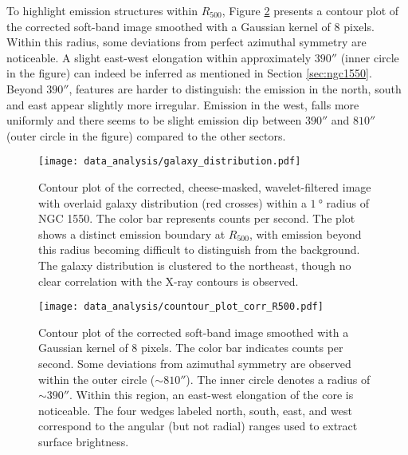 To highlight emission structures within \(R_{500}\), Figure \ref{fig:contour_fully_corrected} presents a contour plot of the corrected soft-band image smoothed with a Gaussian kernel of \(8\) pixels. Within this radius, some deviations from perfect azimuthal symmetry are noticeable. A slight east-west elongation within approximately \(390''\) (inner circle in the figure) can indeed be inferred as mentioned in Section \ref{sec:ngc1550}. Beyond \(390''\), features are harder to distinguish: the emission in the north, south and east appear slightly more irregular. Emission in the west, falls more uniformly and there seems to be slight emission dip between \(390''\) and \(810''\) (outer circle in the figure) compared to the other sectors.
\begin{figure}[htbp]
    \centering
    \texttt{[image: data\_analysis/galaxy\_distribution.pdf]}
    \caption[Contour plot of the corrected, cheese-masked, wavelet-filtered image with overlaid galaxy distribution.]{Contour plot of the corrected, cheese-masked, wavelet-filtered image with overlaid galaxy distribution (red crosses) within a \(\SI{1}{\degree}\) radius of NGC 1550. The color bar represents counts per second. The plot shows a distinct emission boundary at \(R_{500}\), with emission beyond this radius becoming difficult to distinguish from the background. The galaxy distribution is clustered to the northeast, though no clear correlation with the X-ray contours is observed.}
    \label{fig:contour_wvl_filtered}
\end{figure}
\begin{figure}[htbp]
    \centering
    \texttt{[image: data\_analysis/countour\_plot\_corr\_R500.pdf]}
    \caption[Contour plot of the corrected soft-band image smoothed.]{Contour plot of the corrected soft-band image smoothed with a Gaussian kernel of 8 pixels. The color bar indicates counts per second. Some deviations from azimuthal symmetry are observed within the outer circle (\(\sim 810''\)). The inner circle denotes a radius of \(\sim 390''\). Within this region, an east-west elongation of the core is noticeable. The four wedges labeled north, south, east, and west correspond to the angular (but not radial) ranges used to extract surface brightness.}
    \label{fig:contour_fully_corrected}
\end{figure}
